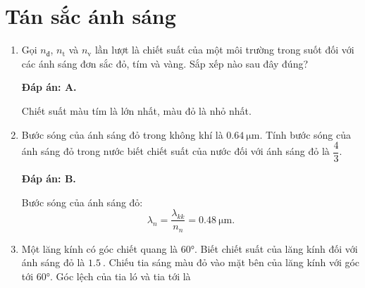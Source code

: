 
\setcounter{section}{0}
\section{Tán sắc ánh sáng}
\begin{enumerate}[label=\bfseries Câu \arabic*:]
	\item {} 
	\cauhoi
	{Gọi $n_\text{đ}$, $n_\text{t}$ và $n_\text{v}$ lần lượt là chiết suất của một môi trường trong suốt đối với các ánh sáng đơn sắc đỏ, tím và vàng. Sắp xếp nào sau đây đúng?
	}
	
	\loigiai
	{		\textbf{Đáp án: A.}
		
Chiết suất màu tím là lớn nhất, màu đỏ là nhỏ nhất.
		
	}
	
	\item {}
	\cauhoi
	{Bước sóng của ánh sáng đỏ trong không khí là $\SI{0.64}{\micro \meter}$. Tính bước sóng của ánh sáng đỏ trong nước biết chiết suất của nước đối với ánh sáng đỏ là $\dfrac{4}{3}$.
	}
	
	\loigiai
	{		\textbf{Đáp án: B.}
		
	Bước sóng của ánh sáng đỏ:
	$$
		\lambda_{n} = \dfrac{\lambda_{kk}}{n_{n}} = \SI{0.48}{\micro \meter}.
	$$
		
	}
	
	\item {} 
	\cauhoi
	{Một lăng kính có góc chiết quang là $\ang{60}$. Biết chiết suất của lăng kính đối với ánh sáng đỏ là $\SI{1.5}{}$. Chiếu tia sáng màu đỏ vào mặt bên của lăng kính với góc tới $\ang{60}$. Góc lệch của tia ló và tia tới là
	}
	

\end{enumerate}
